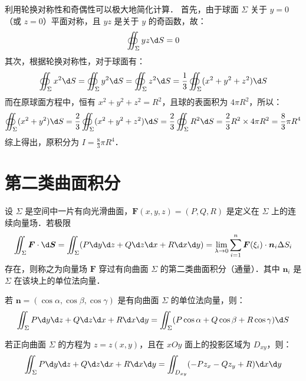 \documentclass[12pt, a4paper, oneside, UTF8]{ctexbook}
\begin{document}
\begin{solution}
    利用轮换对称性和奇偶性可以极大地简化计算．
    首先，由于球面 $\Sigma$ 关于 $y=0$ （或 $z=0$）平面对称，且 $yz$ 是关于 $y$ 的奇函数，故：
    \[ \oiint_\Sigma yz \d S = 0 \]
    其次，根据轮换对称性，对于球面有：
    \[ \oiint_\Sigma x^2 \d S = \oiint_\Sigma y^2 \d S = \oiint_\Sigma z^2 \d S = \frac{1}{3} \oiint_\Sigma (x^2+y^2+z^2) \d S \]
    而在原球面方程中，恒有 $x^2+y^2+z^2=R^2$，且球的表面积为 $4\pi R^2$，所以：
    \[ \oiint_\Sigma (x^2+y^2) \d S = \frac{2}{3} \oiint_\Sigma (x^2+y^2+z^2) \d S = \frac{2}{3} \oiint_\Sigma R^2 \d S = \frac{2}{3} R^2 \times 4\pi R^2 = \frac{8}{3}\pi R^4 \]
    综上得出，原积分为 $\boxed{I = \frac{8}{3}\pi R^4}$．
\end{solution}

\section{第二类曲面积分}
\begin{definition}[第二类曲面积分的定义]
    设 $\Sigma$ 是空间中一片有向光滑曲面，$\bm{F}(x,y,z) = (P, Q, R)$ 是定义在 $\Sigma$ 上的连续向量场．若极限
    \[ \iint_\Sigma \bm{F} \cdot \d \bm{S} = \iint_\Sigma (P \d y \d z + Q \d z \d x + R \d x \d y) = \lim_{\lambda \to 0} \sum_{i=1}^n \bm{F}(\xi_i) \cdot \bm{n}_i \Delta S_i \]
    存在，则称之为向量场 $\bm{F}$ 穿过有向曲面 $\Sigma$ 的第二类曲面积分（通量）．其中 $\bm{n}_i$ 是 $\Sigma$ 在该块上的单位法向量．
\end{definition}

\begin{theorem}[两类曲面积分的关系]
    若 $\bm{n} = (\cos \alpha, \cos \beta, \cos \gamma)$ 是有向曲面 $\Sigma$ 的单位法向量，则：
    \[ \iint_\Sigma P \d y \d z + Q \d z \d x + R \d x \d y = \iint_\Sigma (P \cos \alpha + Q \cos \beta + R \cos \gamma) \d S \]
\end{theorem}

\begin{corollary}
    若正向曲面 $\Sigma$ 的方程为 $z = z(x,y)$，且在 $xOy$ 面上的投影区域为 $D_{xy}$，则：
    \[ \iint_\Sigma P \d y \d z + Q \d z \d x + R \d x \d y = \iint_{D_{xy}} (-P z_x - Q z_y + R) \d x \d y \]
\end{corollary}
\end{document}

